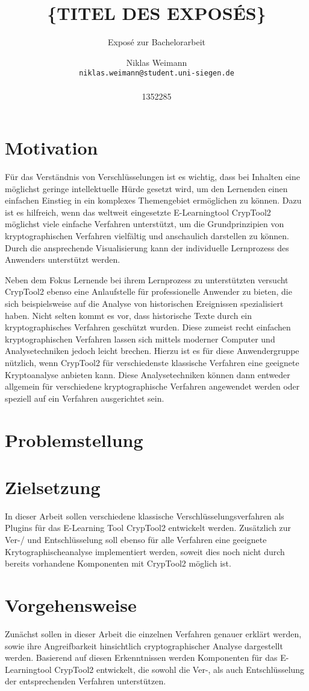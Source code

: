 \documentclass[fontsize=11pt, paper=a4, parskip=half]{scrartcl}
\title{
	\{TITEL DES EXPOSÉS\}
}
\subtitle{Exposé zur 
	Bachelorarbeit
}
\author{
	Niklas Weimann
	\\
	\texttt{niklas.weimann@student.uni-siegen.de}
	\\ \\
	{1352285}
}
\begin{document}
\maketitle

\section{Motivation}
Für das Verständnis von Verschlüsselungen ist es wichtig, dass bei Inhalten eine möglichst geringe intellektuelle Hürde gesetzt wird, um den Lernenden einen einfachen Einstieg in ein komplexes Themengebiet ermöglichen zu können. Dazu ist es hilfreich, wenn das weltweit eingesetzte E-Learningtool CrypTool2 möglichst viele einfache Verfahren unterstützt, um die Grundprinzipien von kryptographischen Verfahren vielfältig und anschaulich darstellen zu können. Durch die ansprechende Visualisierung kann der individuelle Lernprozess des Anwenders unterstützt werden.

Neben dem Fokus Lernende bei ihrem Lernprozess zu unterstützten versucht CrypTool2 ebenso eine Anlaufstelle für professionelle Anwender zu bieten, die sich beispielsweise auf die Analyse von historischen Ereignissen spezialisiert haben. Nicht selten kommt es vor, dass historische Texte durch ein kryptographisches Verfahren geschützt wurden. Diese zumeist recht einfachen kryptographischen Verfahren lassen sich mittels moderner Computer und Analysetechniken jedoch leicht brechen. Hierzu ist es für diese Anwendergruppe nützlich, wenn CrypTool2 für verschiedenste klassische Verfahren eine geeignete Kryptoanalyse anbieten kann. Diese Analysetechniken können dann entweder allgemein für verschiedene kryptographische Verfahren angewendet werden oder speziell auf ein Verfahren ausgerichtet sein.

\section{Problemstellung}




\section{Zielsetzung}
In dieser Arbeit sollen verschiedene klassische Verschlüsselungsverfahren als Plugins für das E-Learning Tool CrypTool2 entwickelt werden. Zusätzlich zur Ver-/ und Entschlüsselung soll ebenso für alle Verfahren eine geeignete Krytographischeanalyse implementiert werden, soweit dies noch nicht durch bereits vorhandene Komponenten mit CrypTool2 möglich ist. 

\section{Vorgehensweise}
Zunächst sollen in dieser Arbeit die einzelnen Verfahren genauer erklärt werden, sowie ihre Angreifbarkeit hinsichtlich cryptographischer Analyse dargestellt werden. Basierend auf diesen Erkenntnissen werden Komponenten für das E-Learningtool CrypTool2 entwickelt, die sowohl die Ver-, als auch Entschlüsselung der entsprechenden Verfahren unterstützen.\cite{Erl2005}

\pagebreak



\end{document}
